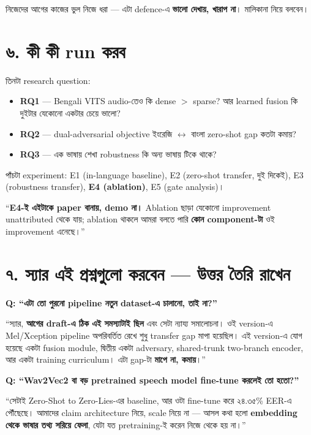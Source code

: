 \documentclass[11pt,a4paper]{article}
\newenvironment{say}{%
  \def\FrameCommand{\textcolor{barcol}{\vrule width 3pt}\hspace{8pt}}%
  \MakeFramed{\advance\hsize-\width \FrameRestore}%
}{\endMakeFramed}
\begin{document}
নিজেদের আগের কাজের ভুল নিজে ধরা --- এটা defence-এ \textbf{ভালো দেখায়, খারাপ না}।
মালিকানা নিয়ে বলবেন।

\section*{৬. কী কী run করব}

তিনটা research question:

\begin{itemize}
\item \textbf{RQ1} --- Bengali VITS audio-তেও কি dense $>$ sparse? আর learned
      fusion কি দুইটার যেকোনো একটার চেয়ে ভালো?
\item \textbf{RQ2} --- dual-adversarial objective ইংরেজি $\leftrightarrow$ বাংলা
      zero-shot gap কতটা কমায়?
\item \textbf{RQ3} --- এক ভাষায় শেখা robustness কি অন্য ভাষায় টিকে থাকে?
\end{itemize}

পাঁচটা experiment: E1 (in-language baseline), E2 (zero-shot transfer, দুই দিকেই),
E3 (robustness transfer), \textbf{E4 (ablation)}, E5 (gate analysis)।

\begin{say}
``\textbf{E4-ই এইটাকে paper বানায়, demo না।} Ablation ছাড়া যেকোনো improvement
unattributed থেকে যায়; ablation থাকলে আমরা বলতে পারি \textbf{কোন component-টা}
ওই improvement এনেছে।''
\end{say}

\section*{৭. স্যার এই প্রশ্নগুলো করবেন --- উত্তর তৈরি রাখেন}

\textbf{Q: ``এটা তো পুরনো pipeline নতুন dataset-এ চালানো, তাই না?''}
\begin{say}
``স্যার, \textbf{আগের draft-এ ঠিক এই সমস্যাটাই ছিল} এবং সেটা ন্যায্য সমালোচনা।
ওই version-এ Mel/Xception pipeline অপরিবর্তিত রেখে শুধু transfer gap মাপা হয়েছিল।
এই version-এ যোগ হয়েছে একটা fusion module, দ্বিতীয় একটা adversary, shared-trunk
two-branch encoder, আর একটা training curriculum। এটা gap-টা \textbf{মাপে না,
কমায়}।''
\end{say}

\textbf{Q: ``Wav2Vec2 বা বড় pretrained speech model fine-tune করলেই তো হতো?''}
\begin{say}
``সেটাই Zero-Shot to Zero-Lies-এর baseline, আর ওটা fine-tune করে ২৪.৩৫\% EER-এ
পৌঁছেছে। আমাদের claim architecture নিয়ে, scale নিয়ে না --- আসল কথা হলো
\textbf{embedding থেকে ভাষার তথ্য সরিয়ে ফেলা}, যেটা যত pretraining-ই করেন নিজে
থেকে হয় না।''
\end{say}
\end{document}
